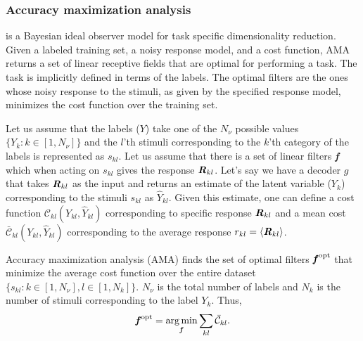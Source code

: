 \documentclass{jov}
\DeclareMathOperator*{\argmin}{arg\,min}
\begin{document}
\subsubsection*{Accuracy maximization analysis}
 \cite{geisler2009optimal,burge2017accuracy} is a Bayesian ideal observer model for task specific dimensionality reduction. Given a labeled training set, a noisy response model, and a cost function, AMA returns a set of linear receptive fields that are optimal for performing a task. The task is implicitly defined in terms of the labels. The optimal filters are the ones whose noisy response to the stimuli, as given by the specified response model, minimizes the cost function over the training set. 

Let us assume that the labels ($Y$) take one of the $N_{\nu}$ possible values $\{Y_k: k\in[1,N_{\nu}] \}$ and the $l$'th stimuli corresponding to the $k$'th category of the labels is represented as $s_{kl}$. Let us assume that there is a set of linear filters {\textbf{\textit f}} which when acting on $s_{kl}$ gives the response ${\textbf{\textit R}}_{kl}$. Let's say we have a decoder $g$ that takes ${\textbf{\textit R}}_{kl}$ as the input and returns an estimate of the latent variable ($Y_k$) corresponding to the stimuli $s_{kl}$ as $\hat{Y}_{kl}$. Given this estimate, one can define a cost function $\mathcal{C}_{kl}(Y_{kl},\hat{Y}_{kl})$ corresponding to specific response ${\textbf{\textit R}}_{kl}$ and a mean cost $\bar{\mathcal{C}}_{kl}(Y_{kl},\hat{Y}_{kl})$ corresponding to the average response $r_{kl} = \langle{\textbf{\textit R}}_{kl}\rangle$. 

Accuracy maximization analysis (AMA) finds the set of optimal filters ${\textbf{\textit f}}^{\rm opt}$ that minimize the average cost function over the entire dataset $\{s_{kl}: k\in[1,N_{\nu}], l\in[1,N_k]\}$. $N_{\nu}$ is the total number of labels and $N_{k}$ is the number of stimuli corresponding to the label $Y_k$. Thus,
\begin{align}
{\textbf {\textit f} }^{\rm opt} = \argmin_{\textbf {\textit f} } \sum_{kl} \bar{\mathcal{C}}_{kl}.
\label{eq:fopt}
\end{align}
\end{document}

